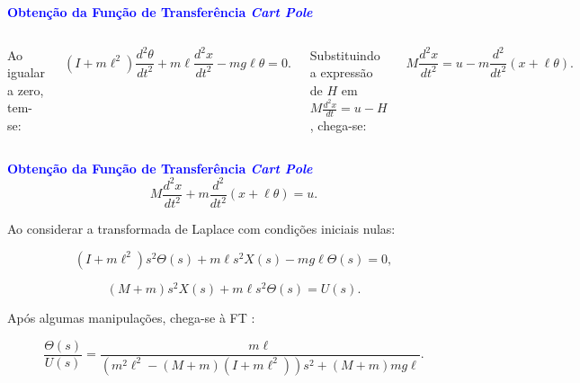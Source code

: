 \documentclass[aspectratio=169]{beamer}
\begin{document}
\begin{frame}{\textcolor{blue}{\textbf{Obtenção da Função de Transferência \textit{Cart Pole}}}}
\begin{columns}
\justifying Ao igualar a zero, tem-se:

\begin{equation}
    (I + m\ell^2)\frac{d^2\theta}{dt^2} + m\ell\frac{d^2x}{dt^2} - mg\ell\theta = 0.
    \label{eq:HeV0}
\end{equation}

\justifying Substituindo a expressão de $H$ em $M\frac{d^2x}{dt} = u - H$, chega-se:

\begin{equation}
    M\frac{d^2x}{dt^2}  = u -  m\frac{d^2}{dt^2} (x + \ell\theta).
    \label{eq:Id2r}
\end{equation}

\end{columns}
\end{frame}


\begin{frame}{\textcolor{blue}{\textbf{Obtenção da Função de Transferência \textit{Cart Pole}}}}
\vspace*{-.75cm}
\begin{equation}
    M\frac{d^2x}{dt^2} + m\frac{d^2}{dt^2} (x + \ell\theta) = u.
    \label{eq:Id2r}
\end{equation}

 Ao considerar a transformada de Laplace com condições iniciais nulas:

\begin{equation}
    (I + m\ell^2)s^2\Theta(s) + m\ell s^2 X(s) - mg\ell\Theta(s) = 0,
    \label{eq:L1}
\end{equation}

\begin{equation}
    (M+m)s^2 X(s) + m\ell s^2\Theta(s) = U(s).
    \label{eq:L2}
\end{equation}

Após algumas manipulações, chega-se à FT \cite{ogata2010engenharia}:

\begin{equation}
    \frac{\Theta (s)}{U(s)} = \frac{m\ell}{(m^2\ell^2-(M+m)(I+m\ell^2))s^2+(M+m)mg\ell}.
    \label{eq:TF}
\end{equation}
\end{frame}

\end{document}
